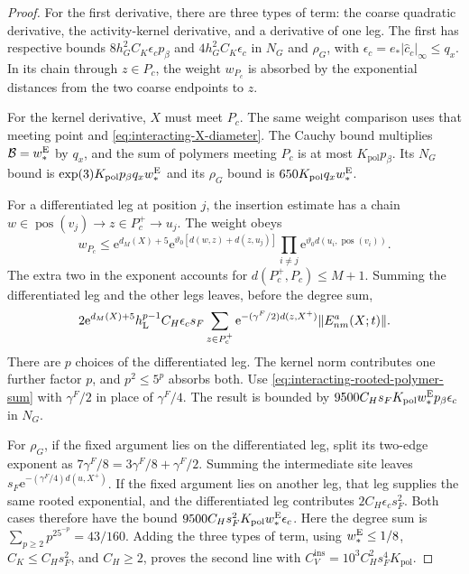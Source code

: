 \begin{proof}
For the first derivative, there are three
types of term: the coarse quadratic derivative,
the activity-kernel derivative, and a derivative
of one leg. The first has respective bounds
$8h_G^2C_K\epsilon_cp_\beta$ and
$4h_G^2C_K\epsilon_c$ in $N_G$ and $\rho_G$,
with $\epsilon_c=e_*|\widehat c_c|_\infty\le q_x$.
In its chain through $z\in P_c$, the weight
$w_{P_c}$ is absorbed by the exponential
distances from the two coarse endpoints to $z$.

For the kernel derivative, $X$ must meet $P_c$.
The same weight comparison uses that meeting
point and \eqref{eq:interacting-X-diameter}.
The Cauchy bound multiplies
$\mathcal B=w_*^{\rm E}$ by $q_x$, and
the sum of polymers meeting $P_c$ is at most
$K_{\mathrm{pol}}p_\beta$. Its $N_G$ bound is
$\exp(3)K_{\mathrm{pol}}p_\beta q_xw_*^{\rm E}$ and its
$\rho_G$ bound is $650K_{\mathrm{pol}}q_xw_*^{\rm E}$.

For a differentiated leg at position $j$, the
insertion estimate has a chain
$w\in\operatorname{pos}(v_j)\to z\in P_c^+\to u_j$.
The weight obeys
\[
 w_{P_c}\le \mathrm e^{d_M(X)+5}
 \mathrm e^{\vartheta_0[d(w,z)+d(z,u_j)]}
            \prod_{i\ne j}\mathrm e^{\vartheta_0d(u_i,\operatorname{pos}(v_i))}.
\]
The extra two in the exponent accounts for
$d(P_c^+,P_c)\le M+1$.
Summing the differentiated leg and the other
legs leaves, before the degree sum,
\[
 2\mathrm e^{d_M(X)+5}h_{\rm L}^{p-1}
       C_H\epsilon_cs_F
       \sum_{z\in P_c^+}\mathrm e^{-(\gamma^F/2)d(z,X^+)}
                                      \|E^a_{nm}(X;t)\|.
\]
There are $p$ choices of the differentiated
leg. The kernel norm contributes one further
factor $p$, and $p^2\le5^p$ absorbs both.
Use \eqref{eq:interacting-rooted-polymer-sum}
with $\gamma^F/2$ in place of $\gamma^F/4$.
The result is bounded by
$9500C_Hs_FK_{\mathrm{pol}}w_*^{\rm E}p_\beta\epsilon_c$
in $N_G$.

For $\rho_G$, if the fixed argument lies on
the differentiated leg, split its two-edge
exponent as $7\gamma^F/8=3\gamma^F/8+\gamma^F/2$.
Summing the intermediate site leaves
$s_F\mathrm e^{-(\gamma^F/4)d(u,X^+)}$.
If the fixed argument lies on another leg,
that leg supplies the same rooted exponential,
and the differentiated leg contributes
$2C_H\epsilon_cs_F^2$.
Both cases therefore have the bound
$9500C_Hs_F^2K_{\mathrm{pol}}w_*^{\rm E}\epsilon_c$.
Here the degree sum is
$\sum_{p\ge2}p^25^{-p}=43/160$.
Adding the three types of term, using
$w_*^{\rm E}\le1/8$, $C_K\le C_Hs_F^2$,
and $C_H\ge2$, proves the second line with
$C_V^{\mathrm{ins}}=10^3C_H^2s_F^4K_{\mathrm{pol}}$.


\end{proof}

